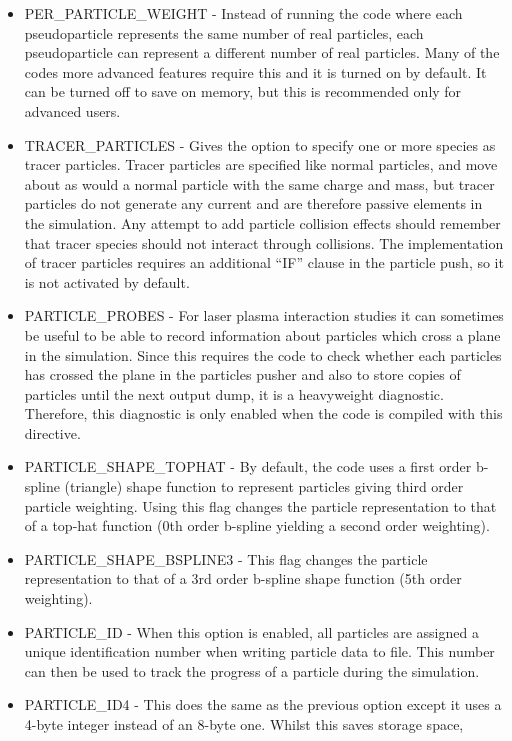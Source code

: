 \begin{itemize}
\item PER\_PARTICLE\_WEIGHT - Instead of running the code where each
  pseudoparticle represents the same number of real particles, each
  pseudoparticle can represent a different number of real particles. Many of
  the codes more advanced features require this and it is turned on by
  default. It can be turned off to save on memory, but this is recommended
  only for advanced users.
\item TRACER\_PARTICLES - Gives the option to specify one or more species as
  tracer particles. Tracer particles are specified like normal particles, and
  move about as would a normal particle with the same charge and mass, but
  tracer particles do not generate any current and are therefore passive
  elements in the simulation. Any attempt to add particle collision effects
  should remember that tracer species should not interact through collisions.
  The implementation of tracer particles requires an additional ``IF'' clause
  in the particle push, so it is not activated by default.
\item PARTICLE\_PROBES - For laser plasma interaction studies it can sometimes
  be useful to be able to record information about particles which cross a
  plane in the simulation. Since this requires the code to check whether each
  particles has crossed the plane in the particles pusher and also to store
  copies of particles until the next output dump, it is a heavyweight
  diagnostic. Therefore, this diagnostic is only enabled when the code is
  compiled with this directive.
\item PARTICLE\_SHAPE\_TOPHAT - By default, the code uses a first order
  b-spline (triangle) shape function to represent particles giving
  third order particle weighting.
  Using this flag changes the particle representation to that of a top-hat
  function (0th order b-spline yielding a second order weighting).
\item PARTICLE\_SHAPE\_BSPLINE3 - This flag changes the particle representation
  to that of a 3rd order b-spline shape function (5th order weighting).
\item PARTICLE\_ID - When this option is enabled, all particles are assigned
  a unique identification number when writing particle data to file. This
  number can then be used to track the progress of a particle during the
  simulation.
\item PARTICLE\_ID4 - This does the same as the previous option except it uses
  a 4-byte integer instead of an 8-byte one. Whilst this saves storage space,

\end{itemize}
